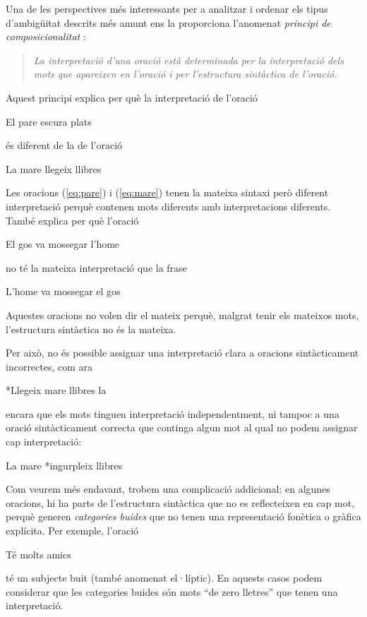 Una de les perspectives més interessants per a analitzar i ordenar els
tipus d'ambigüitat descrits més amunt ens la proporciona l'anomenat
\emph{principi de composicionalitat} \citep[cap.~23]{radford09b}:
\begin{quote} {\sl La interpretació d'una oració està determinada per
    la interpretació dels mots que apareixen en l'oració i per
    l'estructura sintàctica de l'oració.}
\end{quote}
Aquest principi explica per què la interpretació de l'oració
\begin{exemple}
\label{eq:pare}
El pare escura plats
\end{exemple}
és diferent de la de l'oració
\begin{exemple} 
  La mare llegeix llibres
\label{eq:mare}
\end{exemple}
Les oracions (\ref{eq:pare}) i (\ref{eq:mare}) tenen la mateixa
sintaxi però diferent interpretació perquè contenen mots diferents amb
interpretacions diferents. També explica per què l'oració
\begin{exemple}
  El gos va mossegar l'home
\end{exemple}
no té la mateixa interpretació que la frase
\begin{exemple}
  L'home va mossegar el gos
\end{exemple} 
Aquestes oracions no volen dir el mateix perquè, malgrat tenir els
mateixos mots, l'estructura sintàctica no és la mateixa.

Per això, no és possible assignar una interpretació clara a oracions
sin\-tàc\-ti\-ca\-ment incorrectes, com ara
\begin{exemple}
  *Llegeix mare llibres la
\end{exemple} 
encara que els mots tinguen interpretació independentment, ni tampoc a
una oració sintàcticament correcta que continga algun mot al qual no
podem assignar cap interpretació:
\begin{exemple}
  La mare *ingurpleix llibres
\end{exemple}
Com veurem més endavant, trobem una complicació addicional: en algunes
oracions, hi ha parts de l'estructura sintàctica que no es
reflecteixen en cap mot, perquè generen \emph{categories buides} que
no tenen una representació fonètica o gràfica explícita.  Per exemple,
l'oració
\begin{exemple}
  Té molts amics
\end{exemple} 
té un subjecte buit (també anomenat el·líptic). En aquests casos podem
considerar que les categories buides són mots ``de zero lletres'' que
tenen una interpretació.

